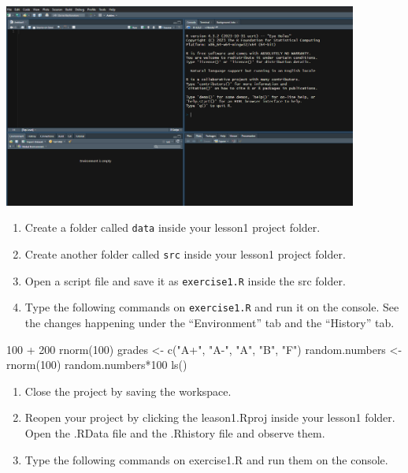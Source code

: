 \documentclass[
  letterpaper,
  DIV=11,
  numbers=noendperiod]{scrreprt}
\newenvironment{Shaded}{\begin{snugshade}}{\end{snugshade}}
\newcommand{\DecValTok}[1]{\textcolor[rgb]{0.68,0.00,0.00}{#1}}
\newcommand{\FunctionTok}[1]{\textcolor[rgb]{0.28,0.35,0.67}{#1}}
\newcommand{\NormalTok}[1]{\textcolor[rgb]{0.00,0.23,0.31}{#1}}
\newcommand{\OtherTok}[1]{\textcolor[rgb]{0.00,0.23,0.31}{#1}}
\newcommand{\SpecialCharTok}[1]{\textcolor[rgb]{0.37,0.37,0.37}{#1}}
\newcommand{\StringTok}[1]{\textcolor[rgb]{0.13,0.47,0.30}{#1}}
\begin{document}
\includegraphics[width=4.58in,height=\textheight,keepaspectratio]{ch1.png}

\begin{enumerate}
\def\labelenumi{\arabic{enumi}.}
\setcounter{enumi}{3}
\item
  Create a folder called \texttt{data} inside your lesson1 project
  folder.
\item
  Create another folder called \texttt{src} inside your lesson1 project
  folder.
\item
  Open a script file and save it as \texttt{exercise1.R} inside the src
  folder.
\item
  Type the following commands on \texttt{exercise1.R} and run it on the
  console. See the changes happening under the ``Environment'' tab and
  the ``History'' tab.
\end{enumerate}

\begin{Shaded}
\begin{Highlighting}[]
\DecValTok{100} \SpecialCharTok{+} \DecValTok{200}
\FunctionTok{rnorm}\NormalTok{(}\DecValTok{100}\NormalTok{)}
\NormalTok{grades }\OtherTok{\textless{}{-}} \FunctionTok{c}\NormalTok{(}\StringTok{"A+"}\NormalTok{, }\StringTok{"A{-}"}\NormalTok{, }\StringTok{"A"}\NormalTok{, }\StringTok{"B"}\NormalTok{, }\StringTok{"F"}\NormalTok{)}
\NormalTok{random.numbers }\OtherTok{\textless{}{-}} \FunctionTok{rnorm}\NormalTok{(}\DecValTok{100}\NormalTok{)}
\NormalTok{random.numbers}\SpecialCharTok{*}\DecValTok{100}
\FunctionTok{ls}\NormalTok{()}
\end{Highlighting}
\end{Shaded}

\begin{enumerate}
\def\labelenumi{\arabic{enumi}.}
\setcounter{enumi}{7}
\item
  Close the project by saving the workspace.
\item
  Reopen your project by clicking the leason1.Rproj inside your lesson1
  folder. Open the .RData file and the .Rhistory file and observe them.
\item
  Type the following commands on exercise1.R and run them on the
  console.
\end{enumerate}
\end{document}
